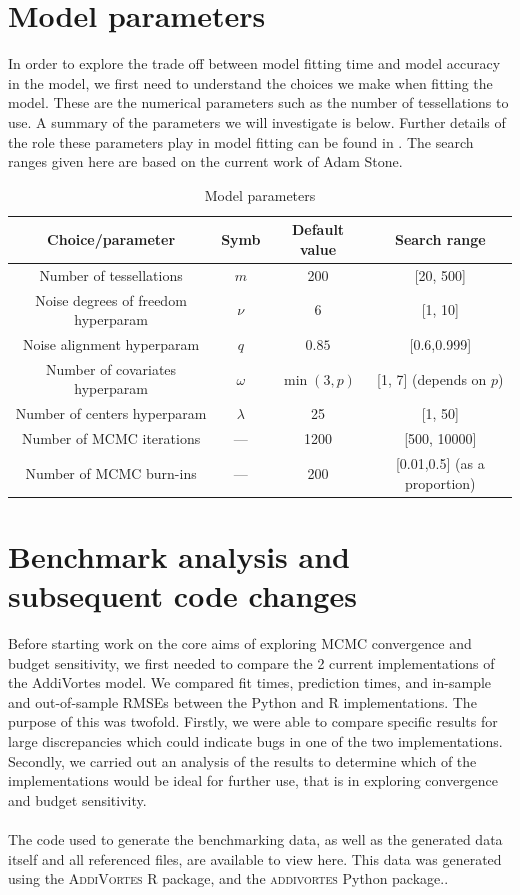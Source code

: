 \documentclass[11pt,twoside,a4paper]{article}
\begin{document}
\section{Model parameters}
In order to explore the trade off between model fitting time and model accuracy in the model, we first need to understand the choices we make when fitting the model. These are the numerical parameters such as the number of tessellations to use. A summary of the parameters we will investigate is below. Further details of the role these parameters play in model fitting can be found in \cite{main-paper}. The search ranges given here are based on the current work of Adam Stone.
\vspace{0.5cm}
\begin{table}[h]
\begin{center}
\begin{tabular}{ |c|c|c|c| }
\hline
\textbf{Choice/parameter} & \textbf{Symb} & \textbf{Default value} & \textbf{Search range} \\
\hline
Number of tessellations & $m$ & 200 & [20, 500]\\
\hline
Noise degrees of freedom hyperparam & $\nu$ & $6$ & [1, 10]\\
Noise alignment hyperparam & $q$ & $0.85$ & [0.6,0.999]\\
\hline
Number of covariates hyperparam & $\omega$ & $\min(3, p)$ & [1, 7] (depends on $p$) \\
Number of centers hyperparam & $\lambda$  & 25 & [1, 50] \\
\hline
Number of MCMC iterations & --- & 1200 & [500, 10000] \\
Number of MCMC burn-ins & --- & 200 & [0.01,0.5] (as a proportion)\\
\hline
\end{tabular}
\caption{Model parameters}
\label{tab:model-parameters}
\end{center}
\end{table}
\section{Benchmark analysis and subsequent code changes}
Before starting work on the core aims of exploring MCMC convergence and budget sensitivity, we first needed to compare the 2 current implementations of the AddiVortes model. We compared fit times, prediction times, and in-sample and out-of-sample RMSEs between the Python and R implementations. The purpose of this was twofold. Firstly, we were able to compare specific results for large discrepancies which could indicate bugs in one of the two implementations. Secondly, we carried out an analysis of the results to determine which of the implementations would be ideal for further use, that is in exploring convergence and budget sensitivity.
\\\\
The code used to generate the benchmarking data, as well as the generated data itself and all referenced files, are available to view here\cite{repo}. This data was generated using the \textsc{AddiVortes} R package\cite{r-repo}, and the \textsc{addivortes} Python package.\cite{py-repo}.
\end{document}
